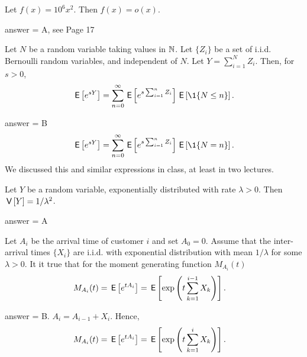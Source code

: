 \begin{exercise}[201902]
Let $f(x) =  10^6 x^2$. Then $f(x) = o(x)$. 
\begin{solution}
answer = A, see Page 17
\end{solution}
\end{exercise}

\begin{exercise}[201902]
  Let $N$ be a random variable taking values in $\mathbb{N}$. Let $\{Z_i\}$ be a set of i.i.d. Bernoulli random variables, and independent of $N$. Let $Y=\sum_{i=1}^N Z_i$. 
  Then, for $s>0$, 
  \begin{equation*}
    \E{e^{sY}} = \sum_{n=0}^\infty \E{e^{s\sum_{i=1}^n Z_i} }\E{\1{N\leq n}}.
  \end{equation*}
\begin{solution} 
answer = B
  \begin{equation*}
    \E{e^{sY}} = \sum_{n=0}^\infty \E{e^{s\sum_{i=1}^n Z_i} }\E{\1{N= n}}.
  \end{equation*}
  We discussed this and similar expressions in class, at least in two lectures.  
\end{solution}
\end{exercise}

\begin{exercise}[201902]
Let $Y$ be a random variable,  exponentially distributed with rate $\lambda>0$. Then $\,\mathsf{V}\left[Y\right] = 1/\lambda^2$. 
\begin{solution}
answer = A %
\end{solution}
\end{exercise}

\begin{exercise}[201902]
 Let $A_i$ be the arrival time of customer $i$ and set $A_0=0$.
    Assume that the inter-arrival times $\{X_i\}$ are i.i.d.  with
    exponential distribution with mean $1/\lambda$ for some
    $\lambda>0$. It it true that  for the  moment generating function $M_{A_i}(t)$
\begin{align*}
  M_{A_i}(t) &= \,\mathsf{E}\left[e^{t A_i}\right] = \,\mathsf{E}\left[\exp\left(t\sum_{k=1}^{i-1} X_k\right)\right].
\end{align*}

\begin{solution}
answer = B. $A_i = A_{i-1} + X_i$. Hence, 
\begin{align*}
  M_{A_i}(t) &= \,\mathsf{E}\left[e^{t A_i}\right] = \,\mathsf{E}\left[\exp\left(t\sum_{k=1}^{i} X_k\right)\right].
\end{align*}
\end{solution}
\end{exercise}

